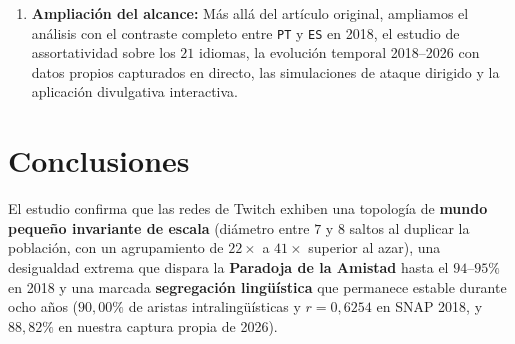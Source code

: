 \documentclass[11pt,a4paper]{article}
\begin{document}
\begin{enumerate}[leftmargin=*, itemsep=2pt]
\begin{itemize}[leftmargin=*, itemsep=1pt]
    \item \textit{Conflictos con el preprocesador de SageMath:} Corregimos el uso de la variable \texttt{D} (reservada al operador derivada \texttt{DerivativeOperator}), la conversión explícita con \texttt{float()} e \texttt{int()} para evitar fallos con tipos \texttt{Rational} y \texttt{RealLiteral}, y la protección de dominio en \texttt{find\_fit} mediante \texttt{abs(x - c)\textasciicircum b}.
    \item \textit{Datación real y saturación del dataset de Kaggle:} Al inspeccionar los \textit{hubs} de \texttt{full\_a.csv} (\texttt{ninja}, \texttt{shroud}, \texttt{tfue}), advertimos que aunque el archivo se alojó en Kaggle en 2023, correspondía realmente a interacciones de 2019, y comprobamos que sin aplicar la poda \texttt{Top-15} la proyección bipartita satura la red ($13,17\%$, $K_{75}$).
    \item \textit{Saturación del búfer IRC en la captura de 2026:} La primera versión enviaba pausas bloqueantes entre comandos \texttt{JOIN} sin leer mensajes entrantes, provocando cortes del servidor (\texttt{ConnectionResetError}). Lo resolvimos implementando unión por tandas no bloqueante (respetando el límite de Twitch), autoguardado periódico y reconexión automática.
  \end{itemize}
  \item \textbf{Ampliación del alcance:} Más allá del artículo original, ampliamos el análisis con el contraste completo entre \texttt{PT} y \texttt{ES} en 2018, el estudio de assortatividad sobre los $21$ idiomas, la evolución temporal 2018--2026 con datos propios capturados en directo, las simulaciones de ataque dirigido y la aplicación divulgativa interactiva.
\end{enumerate}
\newpage
\section{Conclusiones}

El estudio confirma que las redes de Twitch exhiben una topología de \textbf{mundo pequeño invariante de escala} (diámetro entre $7$ y $8$ saltos al duplicar la población, con un agrupamiento de $22\times$ a $41\times$ superior al azar), una desigualdad extrema que dispara la \textbf{Paradoja de la Amistad} hasta el $94\text{--}95\%$ en 2018 y una marcada \textbf{segregación lingüística} que permanece estable durante ocho años ($90,00\%$ de aristas intralingüísticas y $r = 0,6254$ en SNAP 2018, y $88,82\%$ en nuestra captura propia de 2026).
\end{document}
